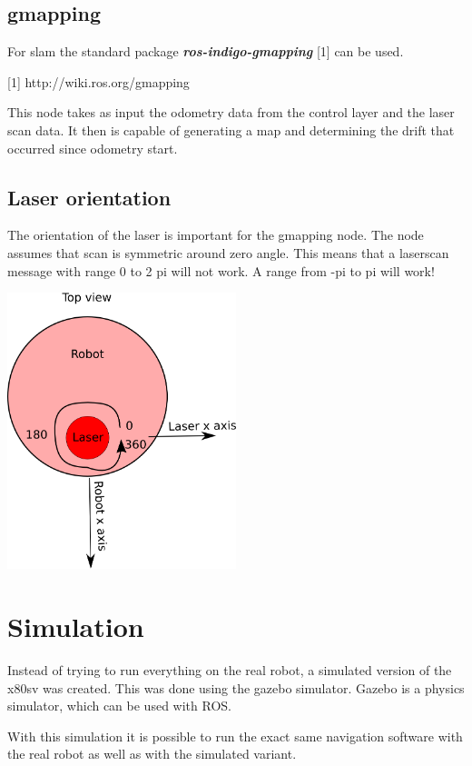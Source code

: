 \documentclass[a4paper]{article}
\newcommand{\rospackage}[1]{\textbf{\textit{#1}}}
\begin{document}
\subsection{gmapping}

For slam the standard package \rospackage{ros-indigo-gmapping} [1] can be used. 

[1] http://wiki.ros.org/gmapping

This node takes as input the odometry data from the control layer and the laser scan
data. It then is capable of generating a map and determining the drift that occurred
since odometry start.

\subsection{Laser orientation}
The orientation of the laser is important for the gmapping node. The node assumes that
scan is symmetric around zero angle. This means that a laserscan message with range
0 to 2 pi will not work. A range from -pi to pi will work!

\includegraphics[width=0.5\textwidth,height=\textheight,keepaspectratio]{img/laser_orientation.png}

\section{Simulation}
Instead of trying to run everything on the real robot, a simulated version of the x80sv
was created. This was done using the gazebo simulator. Gazebo is a physics simulator, which can be
used with ROS.

With this simulation it is possible to run the exact same navigation software with the real
robot as well as with the simulated variant.
\end{document}
